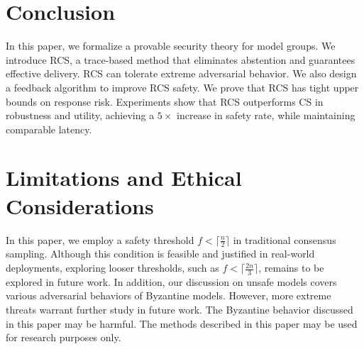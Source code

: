 \documentclass[11pt]{article}
\begin{document}













\section{Conclusion}
In this paper, we formalize a provable security theory for model groups. We introduce RCS, a trace-based method that eliminates abstention and guarantees effective delivery. RCS can tolerate extreme adversarial behavior. We also design a feedback algorithm to improve RCS safety. We prove that RCS has tight upper bounds on response risk. Experiments show that RCS outperforms CS in robustness and utility, achieving a $5\times$ increase in safety rate, while maintaining comparable latency.

\section{Limitations and Ethical Considerations}
In this paper, we employ a safety threshold $f < \lceil \frac{n}{2} \rceil$ in traditional consensus sampling. Although this condition is feasible and justified in real-world deployments, exploring looser thresholds, such as $f < \lceil \frac{2n}{3} \rceil$, remains to be explored in future work. In addition, our discussion on unsafe models covers various adversarial behaviors of Byzantine models. However, more extreme threats warrant further study in future work. The Byzantine behavior discussed in this paper may be harmful. The methods described in this paper may be used for research purposes only.

%

\onecolumn
\newpage

\appendix


\end{document}
